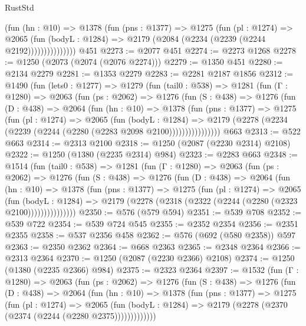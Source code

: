 \begin{lexlean}{RustStd}
\begin{coremodule}
                  (fun (hn : @10) =>
                  @1378
                    (fun (pns : @1377) =>
                    @1275
                      (fun (pl : @1274) =>
                      @2065
                        (fun (bodyL : @1284) =>
                        @2179 (@2084 (@2234 (@2239 (@2244 @2192)))))))))))))))
    @451
@2273 := @2077 @451
@2274 := @2273 @1268
@2278 := @1250 (@2073 (@2074 (@2076 @2274)))
@2279 := @1350 @451
@2280 := @2134 @2279
@2281 := @1353 @2279
@2283 := @2281 @2187 @1856
@2312 := @1490
    (fun (lets0 : @1277) =>
    @1279
      (fun (tail0 : @538) =>
      @1281
        (fun (Γ : @1280) =>
        @2063
          (fun (ps : @2062) =>
          @1276
            (fun (S : @438) =>
            @1276
              (fun (D : @438) =>
              @2064
                (fun (hn : @10) =>
                @1378
                  (fun (pns : @1377) =>
                  @1275
                    (fun (pl : @1274) =>
                    @2065
                      (fun (bodyL : @1284) =>
                      @2179 (@2278 (@2234 (@2239 (@2244 (@2280 (@2283 @2098 @2100))))))))))))))))
    @663
@2313 := @522 @663
@2314 := @2313 @2100
@2318 := @1250 (@2087 (@2230 @2314) @2108)
@2322 := @1250 (@1380 (@2235 @2314) @984)
@2323 := @2283 @663
@2348 := @1514
    (fun (tail0 : @538) =>
    @1281
      (fun (Γ : @1280) =>
      @2063
        (fun (ps : @2062) =>
        @1276
          (fun (S : @438) =>
          @1276
            (fun (D : @438) =>
            @2064
              (fun (hn : @10) =>
              @1378
                (fun (pns : @1377) =>
                @1275
                  (fun (pl : @1274) =>
                  @2065
                    (fun (bodyL : @1284) =>
                    @2179 (@2278 (@2318 (@2322 (@2244 (@2280 (@2323 @2100)))))))))))))))
@2350 := @576 (@579 @594)
@2351 := @539 @708
@2352 := @539 @722
@2354 := @539 @724 @545
@2355 := @2352 @2354
@2356 := @2351 @2355
@2358 := @537 @2356 @458
@2362 := @576 (@692 (@580 @2358)) @597
@2363 := @2350 @2362
@2364 := @668 @2363
@2365 := @2348 @2364
@2366 := @2313 @2364
@2370 := @1250 (@2087 (@2230 @2366) @2108)
@2374 := @1250 (@1380 (@2235 @2366) @984)
@2375 := @2323 @2364
@2397 := @1532
    (fun (Γ : @1280) =>
    @2063
      (fun (ps : @2062) =>
      @1276
        (fun (S : @438) =>
        @1276
          (fun (D : @438) =>
          @2064
            (fun (hn : @10) =>
            @1378
              (fun (pns : @1377) =>
              @1275
                (fun (pl : @1274) =>
                @2065
                  (fun (bodyL : @1284) =>
                  @2179 (@2278 (@2370 (@2374 (@2244 (@2280 @2375)))))))))))))

\end{coremodule}
\end{lexlean}
